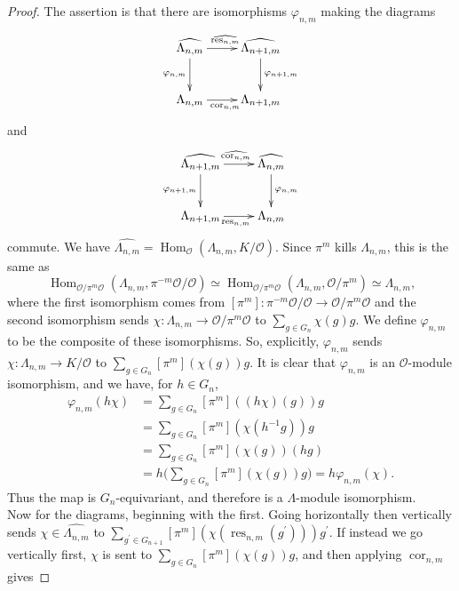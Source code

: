 \documentclass[12 pt]{amsart}
\theoremstyle{plain}
\theoremstyle{definition}
\numberwithin{equation}{section}
\numberwithin{table}{section}
\begin{document}
\begin{proof}
The assertion is that there are isomorphisms $\varphi_{n,m}$ making the diagrams
\begin{equation*}
\xymatrix{\widehat{\Lambda_{n,m}}\ar[r]^{\widehat{\operatorname{res}_{n,m}}} \ar[d]_{\varphi_{n,m}} & \widehat{\Lambda_{n+1,m}}\ar[d]^{\varphi_{n+1,m}}\\
\Lambda_{n,m}\ar[r]_{\operatorname{cor}_{n,m}} & \Lambda_{n+1,m}}
\end{equation*}
and
\begin{equation*}
\xymatrix{\widehat{\Lambda_{n+1,m}}\ar[r]^{\widehat{\operatorname{cor}_{n,m}}} \ar[d]_{\varphi_{n+1,m}} & \widehat{\Lambda_{n,m}}\ar[d]^{\varphi_{n,m}}\\
\Lambda_{n+1,m}\ar[r]_{\operatorname{res}_{n,m}} & \Lambda_{n,m}}
\end{equation*}
commute. We have $\widehat{\Lambda_{n,m}}=\operatorname{Hom}_\mathscr{O}(\Lambda_{n,m},K/\mathscr{O})$. Since $\pi^m$ kills $\Lambda_{n,m}$, this is the same as
\begin{equation*}
\operatorname{Hom}_{\mathscr{O}/\pi^m\mathscr{O}}(\Lambda_{n,m},\pi^{-m}\mathscr{O}/\mathscr{O})\simeq\operatorname{Hom}_{\mathscr{O}/\pi^m\mathscr{O}}
(\Lambda_{n,m},\mathscr{O}/\pi^m)\simeq\Lambda_{n,m}\text{,}
\end{equation*}
where the first isomorphism comes from $[\pi^m]:\pi^{-m}\mathscr{O}/\mathscr{O}\rightarrow\mathscr{O}/\pi^m\mathscr{O}$ and the second isomorphism sends $\chi:\Lambda_{n,m}\rightarrow \mathscr{O}/\pi^m\mathscr{O}$ to $\sum_{g\in G_n}\chi(g) g$. We define $\varphi_{n,m}$ to be the composite of these isomorphisms. So, explicitly, $\varphi_{n,m}$ sends $\chi:\Lambda_{n,m}\rightarrow K/\mathscr{O}$ to $\sum_{g\in G_n}[\pi^m](\chi(g))g$. It is clear that $\varphi_{n,m}$ is an $\mathscr{O}$-module isomorphism, and we have, for $h\in G_n$,
\begin{align*}
\varphi_{n,m}(h\chi)&=\sum_{g\in G_n}[\pi^m]((h\chi)(g))g\\
&=\sum_{g\in G_n}[\pi^m](\chi(h^{-1}g))g\\
&=\sum_{g\in G_n}[\pi^m](\chi(g))(hg)\\
&=h\bigg(\sum_{g\in G_n}[\pi^m](\chi(g))g\bigg)=h\varphi_{n,m}(\chi)\text{.}
\end{align*}
Thus the map is $G_n$-equivariant, and therefore is a $\Lambda$-module isomorphism.\\
\indent Now for the diagrams, beginning with the first. Going horizontally then vertically sends $\chi\in\widehat{\Lambda_{n,m}}$ to $\sum_{g^\prime\in G_{n+1}}[\pi^m](\chi(\operatorname{res}_{n,m}(g^\prime))) g^\prime$. If instead we go vertically first, $\chi$ is sent to $\sum_{g\in G_n}[\pi^m](\chi(g))g$, and then applying $\operatorname{cor}_{n,m}$ gives 

\end{proof}
\end{document}
